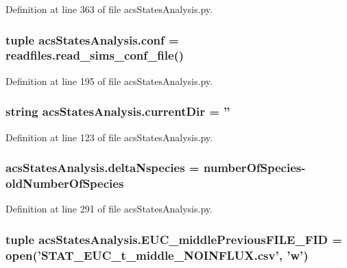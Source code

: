 Definition at line 363 of file acs\-States\-Analysis.\-py.

\hypertarget{a00099_ab8d1341009c3207d501833ef63593ffa}{
\subsubsection[{conf}]{\setlength{\rightskip}{0pt plus 5cm}tuple acs\-States\-Analysis.\-conf = readfiles.\-read\-\_\-sims\-\_\-conf\-\_\-file()}}\label{a00099_ab8d1341009c3207d501833ef63593ffa}


Definition at line 195 of file acs\-States\-Analysis.\-py.

\hypertarget{a00099_ae98225d5c8c20399f5c3b888fa37746f}{
\subsubsection[{current\-Dir}]{\setlength{\rightskip}{0pt plus 5cm}string acs\-States\-Analysis.\-current\-Dir = ''}}\label{a00099_ae98225d5c8c20399f5c3b888fa37746f}


Definition at line 123 of file acs\-States\-Analysis.\-py.

\hypertarget{a00099_a555117703c3245ec7d3d73f5d991c8c5}{
\subsubsection[{delta\-Nspecies}]{\setlength{\rightskip}{0pt plus 5cm}acs\-States\-Analysis.\-delta\-Nspecies = number\-Of\-Species-\/{\bf old\-Number\-Of\-Species}}}\label{a00099_a555117703c3245ec7d3d73f5d991c8c5}


Definition at line 291 of file acs\-States\-Analysis.\-py.

\hypertarget{a00099_afcb9ec3ed11cfcacae8f796af7605425}{
\subsubsection[{E\-U\-C\-\_\-middle\-Previous\-F\-I\-L\-E\-\_\-\-F\-I\-D}]{\setlength{\rightskip}{0pt plus 5cm}tuple acs\-States\-Analysis.\-E\-U\-C\-\_\-middle\-Previous\-F\-I\-L\-E\-\_\-\-F\-I\-D = open('S\-T\-A\-T\-\_\-\-E\-U\-C\-\_\-t\-\_\-middle\-\_\-\-N\-O\-I\-N\-F\-L\-U\-X.\-csv', 'w')}}\label{a00099_afcb9ec3ed11cfcacae8f796af7605425}



